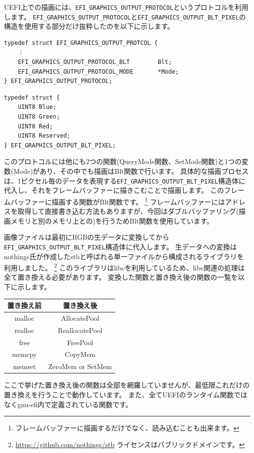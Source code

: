 \documentclass[10pt,b5paper,twoside,openany]{ltjsbook}
\begin{document}
UEFI上での描画には、\verb+EFI_GRAPHICS_OUTPUT_PROTOCOL+というプロトコルを利用します。
\verb+EFI_GRAPHICS_OUTPUT_PROTOCOL+と\verb+EFI_GRAPHICS_OUTPUT_BLT_PIXEL+の構造を使用する部分だけ抜粋したのを以下に示します。
\begin{lstlisting}[caption=EFI\_GRAPHICS\_OUTPUT\_PROTOCOL,label=efi_gop]
typedef struct EFI_GRAPHICS_OUTPUT_PROTCOL {
    ︙
    EFI_GRAPHICS_OUTPUT_PROTOCOL_BLT        Blt;
    EFI_GRAPHICS_OUTPUT_PROTOCOL_MODE       *Mode;
} EFI_GRAPHICS_OUTPUT_PROTOCOL;
\end{lstlisting}
\begin{lstlisting}[caption=EFI\_GRAPHICS\_OUTPUT\_BLT\_PIXEL+,label=efi_gobp]
typedef struct {
    UINT8 Blue;
    UINT8 Green;
    UINT8 Red;
    UINT8 Reserved;
} EFI_GRAPHICS_OUTPUT_BLT_PIXEL;
\end{lstlisting}
このプロトコルには他にも2つの関数(QueryMode関数、SetMode関数)と1つの変数(Mode)があり、その中でも描画はBlt関数で行います。
具体的な描画プロセスは、1ピクセル毎のデータを表現する\verb+EFI_GRAPHICS_OUTPUT_BLT_PIXEL+構造体に代入し、それをフレームバッファーに描きこむことで描画します。
このフレームバッファーに描画する関数がBlt関数です。
\footnote{フレームバッファーに描画するだけでなく、読み込むことも出来ます。}
フレームバッファーにはアドレスを取得して直接書き込む方法もありますが、今回はダブルバッファリング(描画メモリと別のメモリ上との)を行うためBlt関数を使用しています。

画像ファイルは最初にRGBの生データに変換してから\verb+EFI_GRAPHICS_OUTPUT_BLT_PIXEL+構造体に代入します。
生データへの変換はnothings氏が作成したstbと呼ばれる単一ファイルから構成されるライブラリを利用しました。
\footnote{\url{https://github.com/nothings/stb} ライセンスはパブリックドメインです。}
このライブラリはlibcを利用しているため、libc関連の処理は全て置き換える必要があります。
変換した関数と置き換え後の関数の一覧を以下に示します。
\begin{table}[H]
    \centering
    \begin{tabular}{|c|c|}
        \hline
        置き換え前 & 置き換え後 \\
        \hline
        malloc & AllocatePool \\
        realloc & ReallocatePool \\
        free & FreePool \\
        memcpy & CopyMem \\
        memset & ZeroMem or SetMem \\
        \hline
    \end{tabular}
    \label{tb:function}
\end{table}
ここで挙げた置き換え後の関数は全部を網羅していませんが、最低限これだけの置き換えを行うことで動作しています。
また、全てUEFIのランタイム関数ではなくgnu-efi内で定義されている関数です。
\end{document}
